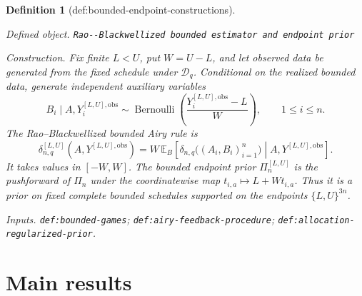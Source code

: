 \documentclass{article}
\newtheorem{definition}{Definition}
\begin{document}
\begin{definition}[def:bounded-endpoint-constructions]\label{def:bounded-endpoint-constructions}
\par\smallskip\noindent\emph{Defined object.} \texttt{Rao-\allowbreak{}-\allowbreak{}Blackwellized bounded estimator and endpoint prior}
\par\smallskip\noindent\emph{Construction.} Fix finite \(L<U\), put \(W=U-L\), and let observed data be generated from the fixed schedule under \(\mathcal D_q\).  Conditional on the realized bounded data, generate independent auxiliary variables
\[
B_i\mid A,Y_i^{[L,U],\mathrm{obs}}
\sim\operatorname{Bernoulli}\left(
\frac{Y_i^{[L,U],\mathrm{obs}}-L}{W}\right),\qquad 1\leq i\leq n.
\]
The Rao--Blackwellized bounded Airy rule is
\[
\delta_{n,q}^{[L,U]}(A,Y^{[L,U],\mathrm{obs}})
=W\,\mathbb E_B\left[
\delta_{n,q}\bigl((A_i,B_i)_{i=1}^n\bigr)
\mathrel{}\middle|\mathrel{} A,Y^{[L,U],\mathrm{obs}}
\right].
\]
It takes values in \([-W,W]\).  The bounded endpoint prior
\(\Pi_n^{[L,U]}\) is the pushforward of \(\Pi_n\) under the coordinatewise map
\(t_{i,a}\mapsto L+Wt_{i,a}\).  Thus it is a prior on fixed complete bounded schedules supported on the endpoints \(\{L,U\}^{3n}\).
\par\smallskip\noindent\emph{Inputs.} \texttt{def:\allowbreak{}bounded-\allowbreak{}games}; \texttt{def:\allowbreak{}airy-\allowbreak{}feedback-\allowbreak{}procedure}; \texttt{def:\allowbreak{}allocation-\allowbreak{}regularized-\allowbreak{}prior}.
\end{definition}

\section{Main results}
\end{document}
